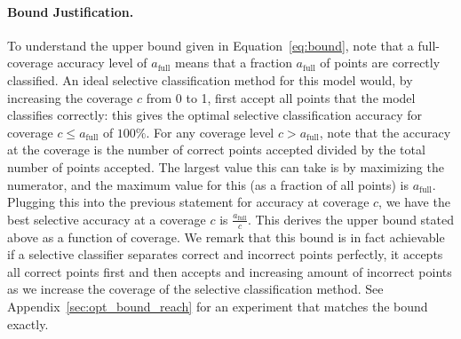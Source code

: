\paragraph{Bound Justification.} To understand the upper bound given in Equation~\ref{eq:bound}, 
note that a full-coverage accuracy level of $a_\text{full}$ means that a fraction $a_\text{full}$ of points are correctly classified. %
An ideal selective classification method for this model would, by increasing the coverage $c$ from 0 to 1, first accept all points that the model classifies correctly: this gives the optimal selective classification accuracy for coverage $c \leq a_{\text{full}}$ of $100\%$. 
For any coverage level $c > a_{\text{full}}$, note that the accuracy at the coverage is the number of correct points accepted divided by the total number of points accepted. The largest value this can take is by maximizing the numerator, and the maximum value for this (as a fraction of all points) is $a_{\text{full}}$. Plugging this into the previous statement for accuracy at coverage $c$, we have the best selective accuracy at a coverage $c$ is $\frac{a_{\text{full}}}{c}$. This derives the upper bound stated above as a function of coverage. We remark that this bound is in fact achievable if a selective classifier separates correct and incorrect points perfectly, \ie it accepts all correct points first and then accepts and increasing amount of incorrect points as we increase the coverage of the selective classification method. See Appendix~\ref{sec:opt_bound_reach} for an experiment that matches the bound exactly. 



